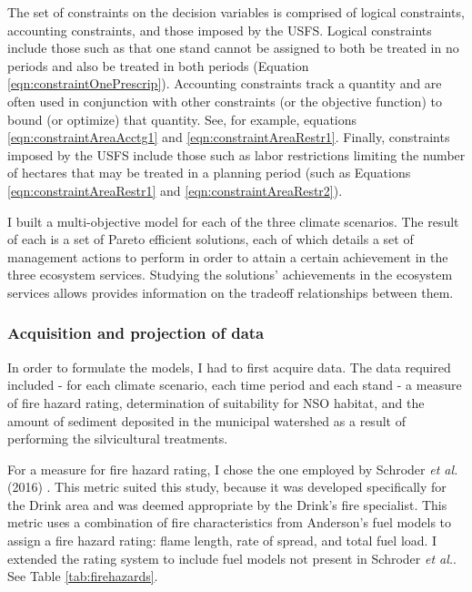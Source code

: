 The set of constraints on the decision variables is comprised of logical constraints, accounting constraints, and those imposed by the USFS. Logical constraints include those such as that one stand cannot be assigned to both be treated in no periods and also be treated in both periods (Equation \ref{eqn:constraintOnePrescrip}). Accounting constraints track a quantity and are often used in conjunction with other constraints (or the objective function) to bound (or optimize) that quantity. See, for example, equations \ref{eqn:constraintAreaAcctg1} and \ref{eqn:constraintAreaRestr1}. Finally, constraints imposed by the USFS include those such as labor restrictions limiting the number of hectares that may be treated in a planning period (such as Equations \ref{eqn:constraintAreaRestr1} and \ref{eqn:constraintAreaRestr2}).

I built a multi-objective model for each of the three climate scenarios. The result of each is a set of Pareto efficient solutions, each of which details a set of management actions to perform in order to attain a certain achievement in the three ecosystem services. Studying the solutions' achievements in the ecosystem services allows provides information on the tradeoff relationships between them.

\subsubsection{Acquisition and projection of data}
In order to formulate the models, I had to first acquire data. The data required included - for each climate scenario, each time period and each stand - a measure of fire hazard rating, determination of suitability for NSO habitat, and the amount of sediment deposited in the municipal watershed as a result of performing the silvicultural treatments.

For a measure for fire hazard rating, I chose the one employed by Schroder \textit{et al.} (2016) \cite{schroder2016multi}. This metric suited this study, because it was developed specifically for the Drink area and was deemed appropriate by the Drink's fire specialist. This metric uses a combination of fire characteristics from Anderson's fuel models \cite{anderson1982aids} to assign a fire hazard rating: flame length, rate of spread, and total fuel load. I extended the rating system to include fuel models not present in Schroder \textit{et al.}. See Table \ref{tab:firehazards}.


